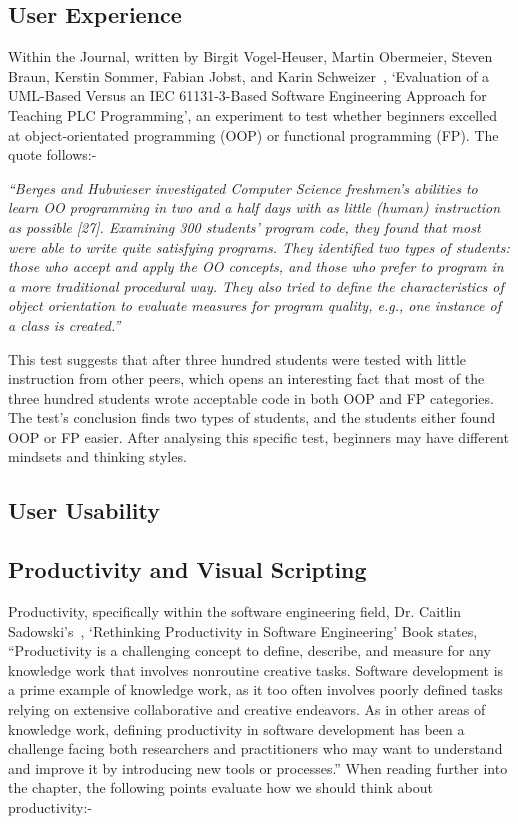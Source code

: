 \documentclass[12pt]{report} %
\begin{document}
		\subsection{User Experience}
		\label{subsec:userExperience}
			Within the Journal, written by Birgit Vogel-Heuser, Martin Obermeier, Steven Braun, Kerstin Sommer, Fabian Jobst, and Karin Schweizer~\cite{vogel-heuser_evaluation_2013}, `Evaluation of a UML-Based Versus an IEC 61131-3-Based Software Engineering Approach for Teaching PLC Programming', an experiment to test whether beginners excelled at object-orientated programming (OOP) or functional programming (FP). The quote follows:-

			\begin{center}
			\textit{``Berges and Hubwieser investigated Computer Science freshmen’s abilities to learn OO programming in two and a half days with as little (human) instruction as possible [27]. Examining 300 students’ program code, they found that most were able to write quite satisfying programs. They identified two types of students: those who accept and apply the OO concepts, and those who prefer to program in a more traditional procedural way. They also tried to define the characteristics of object orientation to evaluate measures for program quality, e.g., one instance of a class is created.''}~\cite{vogel-heuser_evaluation_2013}
			\end{center}

			This test suggests that after three hundred students were tested with little instruction from other peers, which opens an interesting fact that most of the three hundred students wrote acceptable code in both OOP and FP categories. The test's conclusion finds two types of students, and the students either found OOP or FP easier. After analysing this specific test, beginners may have different mindsets and thinking styles.
			
		\subsection{User Usability}

		\subsection{Productivity and Visual Scripting}
			Productivity, specifically within the software engineering field, Dr. Caitlin Sadowski's~\cite{dr_caitlin_sadowski_rethinking_2019}, `Rethinking Productivity in Software Engineering' Book states, ``Productivity is a challenging concept to define, describe, and measure for any knowledge work that involves nonroutine creative tasks. Software development is a prime example of knowledge work, as it too often involves poorly defined tasks relying on extensive collaborative and creative endeavors. As in other areas of knowledge work, defining productivity in software development has been a challenge facing both researchers and practitioners who may want to understand and improve it by introducing new tools or processes.'' When reading further into the chapter, the following points evaluate how we should think about productivity:-
\end{document}
